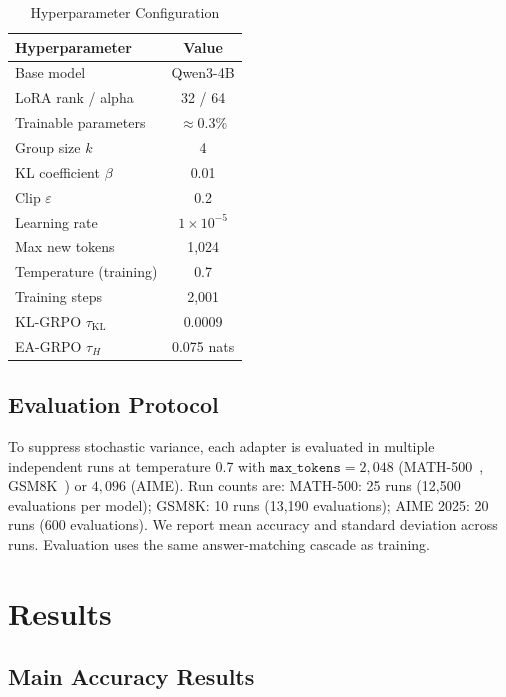 \documentclass{article}
\begin{document}
\begin{table}[!htbp]
\centering
\caption{Hyperparameter Configuration}
\label{tab:hyperparams}
\begin{tabular}{@{}lc@{}}
\toprule
\textbf{Hyperparameter} & \textbf{Value} \\
\midrule
Base model & Qwen3-4B \\
LoRA rank / alpha & 32 / 64 \\
Trainable parameters & $\approx$0.3\% \\
Group size $k$ & 4 \\
KL coefficient $\beta$ & 0.01 \\
Clip $\varepsilon$ & 0.2 \\
Learning rate & $1 \times 10^{-5}$ \\
Max new tokens & 1{,}024 \\
Temperature (training) & 0.7 \\
Training steps & 2{,}001 \\
KL-GRPO $\tau_\text{KL}$ & 0.0009 \\
EA-GRPO $\tau_H$ & 0.075 nats \\
\bottomrule
\end{tabular}
\end{table}

\subsection{Evaluation Protocol}

To suppress stochastic variance, each adapter is evaluated in multiple independent runs at temperature 0.7 with $\texttt{max\_tokens} = 2{,}048$ (MATH-500~\cite{hendrycks2021measuringmathematicalproblemsolving}, GSM8K~\cite{cobbe2021trainingverifierssolvemath}) or $4{,}096$ (AIME). Run counts are: MATH-500: 25 runs (12{,}500 evaluations per model); GSM8K: 10 runs (13{,}190 evaluations); AIME 2025: 20 runs (600 evaluations). We report mean accuracy and standard deviation across runs. Evaluation uses the same answer-matching cascade as training.



\section{Results}

\subsection{Main Accuracy Results}
\end{document}
